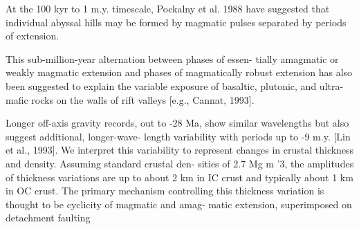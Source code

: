 \documentclass[11pt]{article}
\begin{document}
\begin{enumerate}
\begin{enumerate}
At the 100 kyr to 1 m.y. timescale, Pockalny et al. 1988 have suggested that individual abyssal hills may be formed by magmatic pulses separated by periods of extension. 

This sub-million-year alternation between phases of essen- tially amagmatic or weakly magmatic extension and phases of magmatically robust extension has also been suggested to explain the variable exposure of basaltic, plutonic, and ultra- mafic rocks on the walls of rift valleys [e.g., Cannat, 1993].

Longer off-axis gravity records, out to -28 Ma, show similar wavelengths but also suggest additional, longer-wave- length variability with periods up to -9 m.y. [Lin et al., 1993]. We interpret this variability to represent changes in crustal thickness and density. Assuming standard crustal den- sities of 2.7 Mg m '3, the amplitudes of thickness variations are up to about 2 km in IC crust and typically about 1 km in OC crust. The primary mechanism controlling this thickness variation is thought to be cyclicity of magmatic and amag- matic extension, superimposed on detachment faulting


\end{enumerate}
\end{enumerate}
\end{document}
